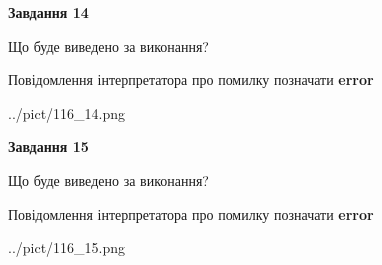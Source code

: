 \documentclass[11pt, ukrainian]{article}
\begin{document}
{\begin {large}
{\begin {center}\textbf{Завдання 14}\end {center}}\par
Що буде виведено за виконання? \par
Повідомлення інтерпретатора про помилку позначати \textbf{error}

\begin{center}
	{../pict/116_14.png}
\end{center}
\newpage

{\begin {center}\textbf{Завдання 15}\end {center}}\par
Що буде виведено за виконання? \par
Повідомлення інтерпретатора про помилку позначати \textbf{error}

\begin{center}
	{../pict/116_15.png}
\end{center}
\newpage

\end {large}}
\end{document}
